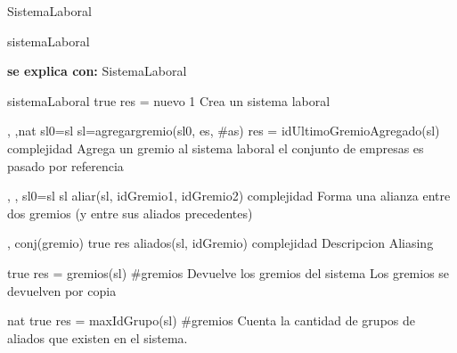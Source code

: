 \begin{interfaz}{SistemaLaboral}
\begin{iparamformales}{sistemaLaboral}

\textbf{\large se explica con:} SistemaLaboral

\end{iparamformales}

{}{sistemaLaboral}
{true}
{res = nuevo}
{1}
{Crea un sistema laboral}
{}

{, ,}{nat}
{sl0=sl}
{sl=agregargremio(sl0, es, \#as) \land res = idUltimoGremioAgregado(sl)}
{complejidad}
{Agrega un gremio al sistema laboral}
{el conjunto de empresas es pasado por referencia}

{, , }{}
{sl0=sl}
{sl \igobs aliar(sl, idGremio1, idGremio2)}
{complejidad}
{Forma una alianza entre dos gremios (y entre sus aliados precedentes)}
{}

{, }{conj(gremio)}
{true}
{res \igobs aliados(sl, idGremio)}
{complejidad}
{Descripcion}
{Aliasing}

{true}
{res = gremios(sl)}
{\#gremios}
{Devuelve los gremios del sistema}
{Los gremios se devuelven por copia}

{}{nat}
{true}
{res = maxIdGrupo(sl)}
{\#gremios}
{Cuenta la cantidad de grupos de aliados que existen en el sistema. }
{}

\end{interfaz}